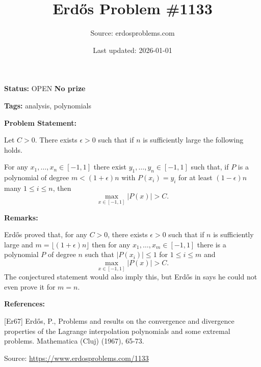 \documentclass{article}
\title{Erd\H{o}s Problem \#1133}
\date{Last updated: 2026-01-01}
\author{Source: erdosproblems.com}
\begin{document}
\maketitle

\noindent\textbf{Status:} OPEN \quad \textbf{No prize}

\noindent\textbf{Tags:} analysis, polynomials

\medskip
\noindent\textbf{Problem Statement:}

Let $C>0$. There exists $\epsilon>0$ such that if $n$ is sufficiently large the following holds.

For any $x_1,\ldots,x_n\in [-1,1]$ there exist $y_1,\ldots,y_n\in [-1,1]$ such that, if $P$ is a polynomial of degree $m<(1+\epsilon)n$ with $P(x_i)=y_i$ for at least $(1-\epsilon)n$ many $1\leq i\leq n$, then\[\max_{x\in [-1,1]}\lvert P(x)\rvert >C.\]

\bigskip
\noindent\textbf{Remarks:}

Erd\H{o}s proved that, for any $C>0$, there exists $\epsilon>0$ such that if $n$ is sufficiently large and $m=\lfloor (1+\epsilon)n\rfloor$ then for any $x_1,\ldots,x_m\in [-1,1]$ there is a polynomial $P$ of degree $n$ such that $\lvert P(x_i)\rvert\leq 1$ for $1\leq i\leq m$ and\[\max_{x\in [-1,1]}\lvert P(x)\rvert>C.\]The conjectured statement would also imply this, but Erd\H{o}s in \cite{Er67} says he could not even prove it for $m=n$.

\bigskip
\noindent\textbf{References:}

[Er67] Erd\H{o}s, P., Problems and results on the convergence and divergence properties of the Lagrange interpolation polynomials and some extremal problems. Mathematica (Cluj) (1967), 65-73.

\bigskip
\noindent\small{Source: \url{https://www.erdosproblems.com/1133}}
\end{document}
